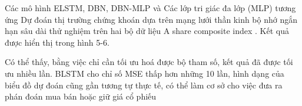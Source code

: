 
Các mô hình ELSTM, DBN, DBN-MLP và
Các lớp tri giác đa lớp (MLP) tương ứng
Dự đoán thị trường chứng khoán dựa trên mạng lưới thần kinh bộ nhớ ngắn hạn sâu dài thử nghiệm trên hai bộ dữ liệu A share composite index . Kết quả được hiển thị trong hình 5-6.

Có thể thấy, bằng việc chỉ cần tối ưu hoá được bộ tham số, kết quả đã được tối ưu nhiều lần. BLSTM cho chỉ số MSE thấp hơn những 10 lần, hình dạng của biểu đồ dự đoán cũng gần tương tự thực tế, có thể làm cơ sở cho việc đưa ra phán đoán mua bán hoặc giữ giá cổ phiếu